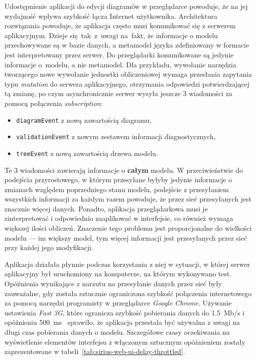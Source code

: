 Udostępnienie aplikacji do edycji diagramów w przeglądarce powoduje, że na
jej wydajność wpływa szybkość łącza Internet użytkownika. Architektura
rozwiązania \SiriusWeb{} powoduje, że aplikacja często musi komunikować
się z serwerem aplikacyjnym. Dzieje się~tak~z~uwagi na~fakt, że informacje o
modelu przechowywane są w bazie danych, a metamodel języka zdefiniowany w
formacie \Ecore{} jest
interpretowany przez serwer. Do przeglądarki komunikowane są jedynie informacje
o~modelu, a nie metamodel. Dla przykładu, wywołanie narzędzia tworzącego nowe
wywołanie jednostki obliczeniowej wymaga przesłania zapytania typu
\emph{mutation} do serwera aplikacyjnego, otrzymania odpowiedzi potwierdzającej
tą zmianę, po czym asynchronicznie serwer wysyła jeszcze 3 wiadomości
za pomocą połączenia \GraphQL{} \emph{subscription}:

\begin{itemize}
	\item \texttt{diagramEvent} z nową zawartością diagramu,
	\item \texttt{validationEvent} z nowym zestawem informacji
	      diagnostycznych,
	\item \texttt{treeEvent} z nową zawartością drzewa modelu.
\end{itemize}

Te 3 wiadomości zawierają informacje o \textbf{całym} modelu. W przeciwieństwie
do podejścia przyrostowego, w którym przesyłane byłyby jedynie informacje o
zmianach względem poprzedniego stanu modelu, podejście z przesyłaniem
wszystkich informacji za każdym razem powoduje, że przez sieć przesyłanych jest
znacznie więcej danych. Ponadto, aplikacja przeglądarkowa musi je
zinterpretować i odpowiednio zaaplikować w interfejsie, co również wymaga
większej ilości obliczeń. Znaczenie tego problemu jest proporcjonalne do
wielkości modelu --- im większy model, tym więcej informacji jest przesyłanych
przez sieć przy każdej jego modyfikacji.

Aplikacja działała płynnie podczas korzystania z niej w sytuacji, w której
serwer aplikacyjny był uruchomiony na komputerze, na którym wykonywano test.
Opóźnienia wynikające z narzutu na przesyłanie danych przez sieć były
zauważalne, gdy została sztucznie ograniczona szybkość połączenia internetowego
za pomocą narzędzi programisty w przeglądarce \emph{Google Chrome}.
Używanie ustawienia \emph{Fast 3G}, które ogranicza szybkość pobierania danych
do 1.5~Mb/s i opóźnieniu
500~ms~\cite{network-throttling-profiles-stackoverflow} sprawiło, że aplikacja
przestała być używalna z uwagi na długi czas pobierania danych o modelu.
Szczegółowe czasy oczekiwania na wyświetlenie elementów interfejsu z włączonym
sztucznym opóźnieniem zostały zaprezentowane w
tabeli~\ref{tab:sirius-web-ui-delay-throttled}.

